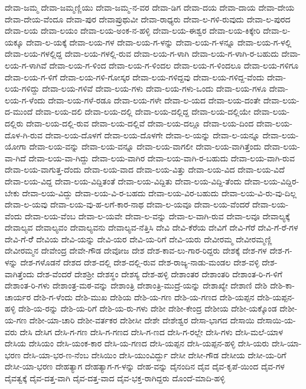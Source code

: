 ದೇವಾ-ಜಮ್ಮ
ದೇವಾ-ಜಮ್ಮಣ್ಣಿಯು
ದೇವಾ-ಜಮ್ಮ-ನ-ವರ
ದೇವಾ-ಡಿಗ
ದೇವಾ-ದಯ
ದೇವಾ-ದಾಯ
ದೇವಾ-ದೇಯ
ದೇವಾ-ದೇಯ-ವೆಂದೂ
ದೇವಾ-ಪುರ
ದೇವಾಪ್ರುಥುವೀ
ದೇವಾ-ರಾಧ್ಯರು
ದೇವಾ-ಲ-ಗಳಿ-ರುವುದು
ದೇವಾ-ಲ-ಪುರದ
ದೇವಾ-ಲಯ
ದೇವಾ-ಲಯಂ
ದೇವಾ-ಲಯ-ಅಂಕ-ನ-ಹಳ್ಳಿ
ದೇವಾ-ಲಯ-ಈಶ್ವರ
ದೇವಾ-ಲಯ-ಕಿಕ್ಕೇರಿ
ದೇವಾ-ಲ-ಯಕ್ಕೂ
ದೇವಾ-ಲ-ಯಕ್ಕೆ
ದೇವಾ-ಲಯ-ಗಳ
ದೇವಾ-ಲಯ-ಗ-ಳನ್ನು
ದೇವಾ-ಲಯ-ಗ-ಳನ್ನೂ
ದೇವಾ-ಲಯ-ಗ-ಳಲ್ಲಿ
ದೇವಾ-ಲಯ-ಗಳಲ್ಲಿದ್ದ
ದೇವಾ-ಲಯ-ಗಳಲ್ಲಿ-ರುವ
ದೇವಾ-ಲಯ-ಗ-ಳಾಗಿ
ದೇವಾ-ಲಯ-ಗ-ಳಾಗಿ-ರ-ಬಹುದು
ದೇವಾ-ಲಯ-ಗ-ಳಾಗಿವೆ
ದೇವಾ-ಲಯ-ಗ-ಳಿಂದ
ದೇವಾ-ಲಯ-ಗ-ಳಿಂದಲ
ದೇವಾ-ಲಯ-ಗ-ಳಿಂದಲೂ
ದೇವಾ-ಲಯ-ಗಳಿಗೂ
ದೇವಾ-ಲಯ-ಗ-ಳಿಗೆ
ದೇವಾ-ಲಯ-ಗಳಿ-ಗೋಸ್ಕರ
ದೇವಾ-ಲಯ-ಗಳಿದ್ದವು
ದೇವಾ-ಲಯ-ಗಳಿದ್ದ-ವೆಂದು
ದೇವಾ-ಲಯ-ಗಳಿದ್ದು
ದೇವಾ-ಲಯ-ಗಳಿವೆ
ದೇವಾ-ಲಯ-ಗಳು
ದೇವಾ-ಲಯ-ಗಳು-ಒಂದು
ದೇವಾ-ಲಯ-ಗಳೂ
ದೇವಾ-ಲಯ-ಗ-ಳೆಂದು
ದೇವಾ-ಲಯ-ಗಳೆ-ರಡೂ
ದೇವಾ-ಲಯ-ಗಳೇ
ದೇವಾ-ಲ-ಯದ
ದೇವಾ-ಲಯ-ದಂತೇ
ದೇವಾ-ಲಯ-ದ-ಮುಂದೆ
ದೇವಾ-ಲಯ-ದಲಿ
ದೇವಾ-ಲಯ-ದಲ್ಲಿ
ದೇವಾ-ಲಯ-ದಲ್ಲಿದ್ದ
ದೇವಾ-ಲಯ-ದಲ್ಲಿಯೇ
ದೇವಾ-ಲಯ-ದಲ್ಲಿರು
ದೇವಾ-ಲಯ-ದಲ್ಲಿ-ರುವ
ದೇವಾ-ಲಯ-ದಲ್ಲಿವೆ
ದೇವಾ-ಲಯ-ದಲ್ಲೂ
ದೇವಾ-ಲಯ-ದಿಂದ
ದೇವಾ-ಲಯ-ದೊಳ-ಗಿ-ರುವ
ದೇವಾ-ಲಯ-ದೊಳಗೆ
ದೇವಾ-ಲಯ-ದೊಳಗೇ
ದೇವಾ-ಲ-ಯನ್ನು
ದೇವಾ-ಲ-ಯನ್ನೂ
ದೇವಾ-ಲಯ-ಯೋಗಾ
ದೇವಾ-ಲಯ-ವನ್ನು
ದೇವಾ-ಲಯ-ವನ್ನೂ
ದೇವಾ-ಲಯ-ವಾಗಲೀ
ದೇವಾ-ಲಯ-ವಾಗಿತ್ತೆಂದು
ದೇವಾ-ಲಯ-ವಾ-ಗಿದೆ
ದೇವಾ-ಲಯ-ವಾ-ಗಿದ್ದು
ದೇವಾ-ಲಯ-ವಾಗಿರ
ದೇವಾ-ಲಯ-ವಾಗಿ-ರ-ಬಹುದು
ದೇವಾ-ಲಯ-ವಾಗಿ-ರುವ
ದೇವಾ-ಲಯ-ವಾಗುತ್ತ-ದೆಂದು
ದೇವಾ-ಲಯ-ವಾದ
ದೇವಾ-ಲಯ-ವಿತ್ತು
ದೇವಾ-ಲಯ-ವಿದ
ದೇವಾ-ಲಯ-ವಿದೆ
ದೇವಾ-ಲಯ-ವಿದ್ದ
ದೇವಾ-ಲಯ-ವಿದ್ದಿತಂತೆ
ದೇವಾ-ಲಯ-ವಿದ್ದಿತು
ದೇವಾ-ಲಯ-ವಿದ್ದಿ-ತೆಂದು
ದೇವಾ-ಲಯ-ವಿದ್ದಿರ-ಬೇಕು
ದೇವಾ-ಲಯ-ವಿದ್ದು
ದೇವಾ-ಲಯ-ವಿ-ರ-ಬಹದು
ದೇವಾ-ಲಯ-ವಿರ-ಬಹುದು
ದೇವಾ-ಲಯ-ವಿ-ರು-ವು-ದಿಲ್ಲ
ದೇವಾ-ಲ-ಯವು
ದೇವಾ-ಲಯ-ವು-ಹ-ಲಗೆ-ಕಾರ-ನಾಥ
ದೇವಾ-ಲ-ಯವೂ
ದೇವಾ-ಲಯ-ವೆಂದರೆ
ದೇವಾ-ಲಯ-ವೆಂದು
ದೇವಾ-ಲಯ-ವೆಂಬ
ದೇವಾ-ಲ-ಯವೇ
ದೇವಾ-ಲ-ವನ್ನು
ದೇವಾ-ಲ-ವಾಗಿ-ರುವ
ದೇವಾ-ಲವೂ
ದೇವಾಲ್ಯಕ್ಕೆ
ದೇವಾಲ್ಯವ
ದೇವಾಲ್ಯವಂ
ದೇವಾಲ್ಯವನು
ದೇವಾಲ್ಯವ-ನೆತ್ತಿಸಿ
ದೇವಿ
ದೇವಿ-ಕೆರೆಯ
ದೇವಿಗೆ
ದೇವಿ-ಗೆರೆ
ದೇವಿ-ಗೆ-ರೆ-ಗಳ
ದೇವಿ-ಗೆ-ರೆೆ
ದೇವಿಯ
ದೇವಿ-ಯನ್ನು
ದೇವಿ-ಯರ
ದೇವಿ-ಯ-ರಿಗೆ
ದೇವಿ-ಯರು
ದೇವೀರಮ್ಮ
ದೇವೀರಮ್ಮಣ್ಣಿ
ದೇವೀರಮ್ಮನ
ದೇವೇಂದ್ರ
ದೇವೇ-ಗೌಡ
ದೇವೋಜ
ದೇಶ
ದೇಶ-ಕಾವ-ಲು-ಗಾರ-ರಿದ್ದರು
ದೇಶಕ್ಕೆ
ದೇಶ-ಗಳ
ದೇಶ-ಗ-ಳನ್ನು
ದೇಶ-ಗಳೊಡನೆ
ದೇಶದ
ದೇಶ-ದಲ್ಲಿ
ದೇಶ-ದಲ್ಲಿ-ರುವ
ದೇಶ-ರಾಜ್ಯ-ನಾಡು-ಮಂಡಲ
ದೇಶ-ವಳ್ಳಿ
ದೇಶ-ವಾಗಿತ್ತೆಂದು
ದೇಶ-ವೆಂದರೆ
ದೇಶಶ್ರೀ
ದೇಶಸ್ಥಂ
ದೇಶಸ್ಯ
ದೇಶ-ಹಳ್ಳಿ
ದೇಶಾಂತರ
ದೇಶಾಂತರಿ
ದೇಶಾಂತ-ರಿ-ಗ-ಳಿಗೆ
ದೇಶಾಂತ-ರಿ-ಗಳು
ದೇಶಾಂತ್ರ-ಮಠ-ವನ್ನು
ದೇಶಾಂತ್ರಿ
ದೇಶಾಂತ್ರಿ-ಮುದ್ರೆ-ಯನ್ನು
ದೇಶಾಖ್ಯೇ
ದೇಶಾಣಿ
ದೇಶಿ
ದೇಶಿ-ಕಾ-ಚಾರ್ಯರ
ದೇಶಿ-ಗ-ಳೆಂದು
ದೇಶಿ-ಮುಖ
ದೇಶಿಯ
ದೇಶಿ-ಯ-ಗಣ
ದೇಶಿ-ಯ-ಗಣದ
ದೇಶಿ-ಯಪ್ಪನ
ದೇಶಿ-ಯಪ್ಪನ-ಹಳ್ಳಿ
ದೇಶಿ-ಯ-ರನ್ನು
ದೇಶಿ-ಯ-ರಿಗೆ
ದೇಶಿ-ಯ-ರು-ಗಳು
ದೇಶೀ
ದೇಶೀ-ಕೇಂದ್ರ
ದೇಶೀಯ
ದೇಶೀ-ಯಕ್ಕೊಂಡ
ದೇಶೀ-ಯ-ಗಣ
ದೇಶೀ-ಯಾ-ಚಾರಿ
ದೇಶೀ-ವರ್ತಕರ
ದೇಶೀಸೀ
ದೇಶೇ
ದೇಶೇಶ್ವರ
ದೇಸಾ-ಭಾಗದ
ದೇಸಾಯಿ
ದೇಸಾಯಿ-ಯ-ವರು
ದೇಸಿ
ದೇಸಿಗ
ದೇಸಿ-ಗ-ಗಣ
ದೇಸಿ-ಗ-ಗಣದ
ದೇಸಿ-ಗ-ಣದ
ದೇಸಿ-ಗ-ರಲ್ಲೇ
ದೇಸಿ-ಗಳು
ದೇಸಿ-ಮಲೆ-ಯಾಳ
ದೇಸಿಯ
ದೇಸಿಯಂ
ದೇಸಿ-ಯಂಕ-ಕಾರ
ದೇಸಿ-ಯ-ಗಣದ
ದೇಸಿ-ಯಪ್ಪನ
ದೇಸಿ-ಯಪ್ಪನ-ಹಳ್ಳಿ
ದೇಸಿ-ಯರು
ದೇಸಿ-ಯಾ-ಭರಣ
ದೇಸಿ-ಯಾ-ಭರ-ಣ-ನೆಂಬ
ದೇಸಿಯಿಂ
ದೇಸಿ-ಯುಂವಿರ್ದ್ದು
ದೇಸೀ
ದೇಸೀ-ಗೌಡ
ದೇಸೀಯ
ದೇಸೀ-ಯ-ರಿಗೆ
ದೇಸೀ-ಯಾ-ಭರಣ
ದೇಹತ್ಯಾಗ
ದೇಹತ್ಯಾಗ-ಗ-ಳನ್ನು
ದೇಹ-ವನ್ನು
ದೈನಂದಿನ
ದೈವ
ದೈವ-ಕೃಪೆ-ಯಿಂದ
ದೈವ-ಗಳ
ದೈವತ್ವಕ್ಕೆ
ದೈವ-ದತ್ತ-ವಾಗಿ
ದೈವ-ದತ್ತ-ವಾದ
ದೈವ-ಭಕ್ತ-ರಾಗಿದ್ದರು
ದೊಂದೆ-ಮಾದಿ-ಹಳ್ಳಿ
